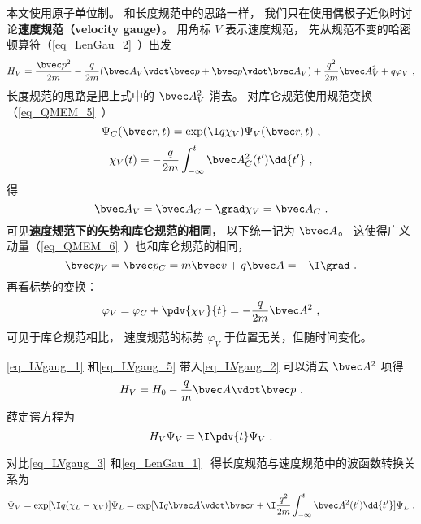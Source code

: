 

本文使用原子单位制。 和长度规范中的思路一样， 我们只在使用偶极子近似时讨论\textbf{速度规范（velocity gauge）}。 用角标 $V$ 表示速度规范， 先从规范不变的哈密顿算符（\autoref{eq_LenGau_2}~）出发
\begin{equation}\label{eq_LVgaug_2}
H_V = \frac{\bvec p^2}{2m} - \frac{q}{2m} (\bvec A_V \vdot \bvec p + \bvec p \vdot \bvec A_V)
+ \frac{q^2}{2m} \bvec A_V^2 + q \varphi_V~,
\end{equation}
长度规范的思路是把上式中的 $\bvec A_V^2$ 消去。 对库仑规范使用规范变换（\autoref{eq_QMEM_5}~）
\begin{equation}\label{eq_LVgaug_3}
\Psi_C(\bvec r, t) = \exp(\I q\chi_V)\Psi_V(\bvec r, t)~,
\end{equation}
\begin{equation}\label{eq_LVgaug_4}
\chi_V(t) = -\frac{q}{2m} \int_{-\infty}^t \bvec A_C^2(t') \dd{t'}~,
\end{equation}
得
\begin{equation}\label{eq_LVgaug_1}
\bvec A_V = \bvec A_C - \grad \chi_V = \bvec A_C~.
\end{equation}
可见\textbf{速度规范下的矢势和库仑规范的相同}， 以下统一记为 $\bvec A$。 这使得广义动量（\autoref{eq_QMEM_6}~）也和库仑规范的相同， 
\begin{equation}
\bvec p_V = \bvec p_C =  m \bvec v + q\bvec A = -\I \grad~.
\end{equation}
再看标势的变换：
\begin{equation}\label{eq_LVgaug_5}
\varphi_V = \varphi_C + \pdv{\chi_V}{t} = - \frac{q}{2m} \bvec A^2~,
\end{equation}
可见于库仑规范相比， 速度规范的标势 $\varphi_V$ 于位置无关，但随时间变化。

\autoref{eq_LVgaug_1} 和\autoref{eq_LVgaug_5} 带入\autoref{eq_LVgaug_2} 可以消去 $\bvec A^2$ 项得
\begin{equation}
H_V = H_0 - \frac{q}{m} \bvec A \vdot \bvec p~.
\end{equation}
薛定谔方程为
\begin{equation}\label{eq_LVgaug_7}
H_V \Psi_V = \I \pdv{t} \Psi_V~.
\end{equation}


对比\autoref{eq_LVgaug_3} 和\autoref{eq_LenGau_1}~ 得长度规范与速度规范中的波函数转换关系为
\begin{equation}\label{eq_LVgaug_6}
\Psi_V = \exp[\I q(\chi_L - \chi_V)]\Psi_L = \exp[\I q \bvec A\vdot \bvec r + \I\frac{q^2}{2m}\int_{-\infty}^t \bvec A^2(t')\dd{t'}] \Psi_L~.
\end{equation}
